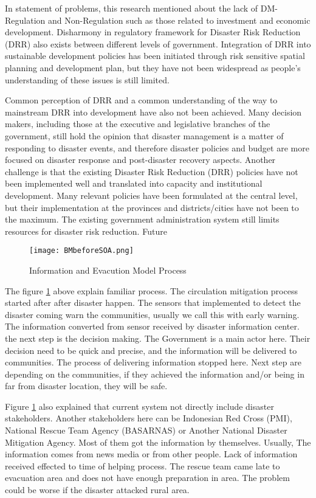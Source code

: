 In statement of problems, this research mentioned about the lack of DM-Regulation and Non-Regulation such as those related to investment and economic development. Disharmony in regulatory framework for Disaster Risk Reduction (DRR) also exists between different levels of government. Integration of DRR into sustainable development policies has been initiated through risk sensitive spatial planning and development plan, but they have not been widespread as people’s understanding of these issues is still limited.\par
Common perception of DRR and a common understanding of the way to mainstream DRR into development have also not been achieved. Many decision makers, including those at the executive and legislative branches of the government, still hold the opinion that disaster management is a matter of responding to disaster events, and therefore disaster policies and budget are more focused on disaster response and post-disaster recovery aspects. Another challenge is that the existing Disaster Risk Reduction (DRR) policies have not been implemented well and translated into capacity and institutional development. Many relevant policies have been formulated at the central level, but their implementation at the provinces and districts/cities have not been to the maximum. The existing government administration system still limits resources for disaster risk reduction.
Future\par 

\begin{figure}[H]
\begin{center}
\texttt{[image: BMbeforeSOA.png]}
\caption{Information and Evacution Model Process}
\label{fig:EvaModel01}
\end{center}
\end{figure}

The figure \ref{fig:EvaModel01} above explain familiar process. The circulation mitigation process started after after disaster happen. The sensors that implemented to detect the disaster coming warn the communities, usually we call this with early warning. The information converted from sensor received by disaster information center. the next step is the decision making. The Government is a main actor here. Their decision need to be quick and precise, and the information will be delivered to communities. The process of delivering information  stopped here. Next step are depending on the communities, if they achieved the information and/or being in far from disaster location, they will be safe.\par
Figure \ref{fig:EvaModel01} also explained that current system not directly include disaster stakeholders.  Another stakeholders here can be Indonesian Red Cross (PMI), National Rescue Team Agency (BASARNAS) or Another National Disaster Mitigation Agency. Most of them got the information by themselves. Usually, The information comes from news media or from other people. Lack of information received effected to time of helping process. The rescue team came late to evacuation area and does not have enough preparation in area. The problem could be worse if the disaster attacked rural area.\par 

